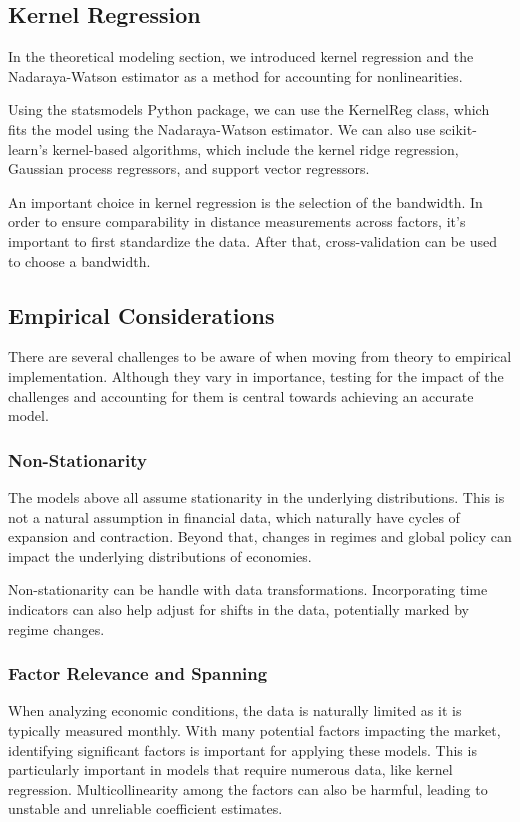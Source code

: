 \subsection{Kernel Regression}

In the theoretical modeling section, we introduced kernel regression and the Nadaraya-Watson estimator as a method for accounting for nonlinearities.

Using the statsmodels Python package, we can use the KernelReg class, which fits the model using the Nadaraya-Watson estimator. We can also use scikit-learn's kernel-based algorithms, which include the kernel ridge regression, Gaussian process regressors, and support vector regressors.

An important choice in kernel regression is the selection of the bandwidth. In order to ensure comparability in distance measurements across factors, it's important to first standardize the data. After that, cross-validation can be used to choose a bandwidth.

\subsection{Empirical Considerations}

There are several challenges to be aware of when moving from theory to empirical implementation. Although they vary in importance, testing for the impact of the challenges and accounting for them is central towards achieving an accurate model.

\subsubsection{Non-Stationarity}

The models above all assume stationarity in the underlying distributions. This is not a natural assumption in financial data, which naturally have cycles of expansion and contraction. Beyond that, changes in regimes and global policy can impact the underlying distributions of economies.

Non-stationarity can be handle with data transformations. Incorporating time indicators can also help adjust for shifts in the data, potentially marked by regime changes.

\subsubsection{Factor Relevance and Spanning}

When analyzing economic conditions, the data is naturally limited as it is typically measured monthly. With many potential factors impacting the market, identifying significant factors is important for applying these models. This is particularly important in models that require numerous data, like kernel regression. Multicollinearity among the factors can also be harmful, leading to unstable and unreliable coefficient estimates. 

